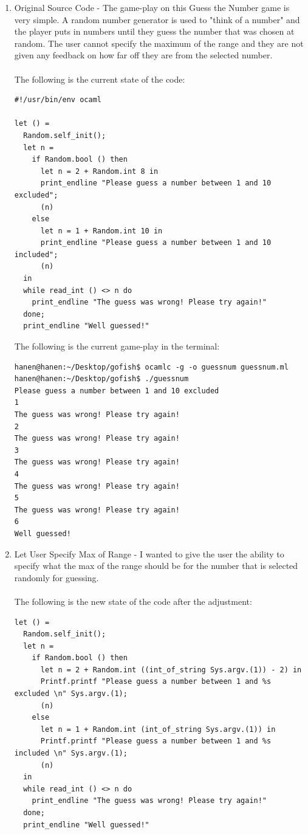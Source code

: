 \documentclass{article}
\begin{document}
\begin{enumerate}
\item Original Source Code - The game-play on this Guess the Number game is very simple. A random number generator is used to "think of a number" and the player puts in numbers until they guess the number that was chosen at random. The user cannot specify the maximum of the range and they are not given any feedback on how far off they are from the selected number. \\ \\
The following is the current state of the code:
\begin{verbatim}
#!/usr/bin/env ocaml
 
let () =
  Random.self_init();
  let n =
    if Random.bool () then
      let n = 2 + Random.int 8 in
      print_endline "Please guess a number between 1 and 10 excluded";
      (n)
    else
      let n = 1 + Random.int 10 in
      print_endline "Please guess a number between 1 and 10 included";
      (n)
  in
  while read_int () <> n do
    print_endline "The guess was wrong! Please try again!"
  done;
  print_endline "Well guessed!"
\end{verbatim}

The following is the current game-play in the terminal:
\begin{verbatim}
hanen@hanen:~/Desktop/gofish$ ocamlc -g -o guessnum guessnum.ml
hanen@hanen:~/Desktop/gofish$ ./guessnum
Please guess a number between 1 and 10 excluded
1
The guess was wrong! Please try again!
2
The guess was wrong! Please try again!
3
The guess was wrong! Please try again!
4
The guess was wrong! Please try again!
5
The guess was wrong! Please try again!
6
Well guessed!
\end{verbatim}

\item Let User Specify Max of Range - I wanted to give the user the ability to specify what the max of the range should be for the number that is selected randomly for guessing. \\ \\
The following is the new state of the code after the adjustment:
\begin{verbatim}
let () =
  Random.self_init();
  let n =
    if Random.bool () then
      let n = 2 + Random.int ((int_of_string Sys.argv.(1)) - 2) in
      Printf.printf "Please guess a number between 1 and %s excluded \n" Sys.argv.(1);
      (n)
    else
      let n = 1 + Random.int (int_of_string Sys.argv.(1)) in
      Printf.printf "Please guess a number between 1 and %s included \n" Sys.argv.(1);
      (n)
  in
  while read_int () <> n do
    print_endline "The guess was wrong! Please try again!"
  done;
  print_endline "Well guessed!"
\end{verbatim}


\end{enumerate}
\end{document}
